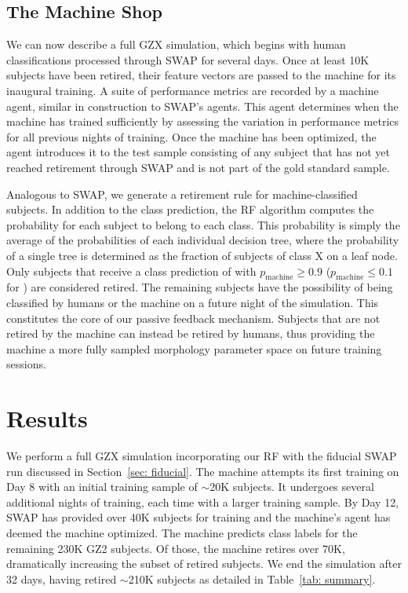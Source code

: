 \subsection{The Machine Shop}\label{sec: machine shop}
We can now describe a full GZX simulation, which begins with human classifications 
processed through SWAP for several days.   
Once at least 10K subjects have been retired, their feature vectors are passed to 
the machine for its inaugural training. 
A suite of performance metrics are recorded by a machine agent, similar
in construction to SWAP's agents. This agent determines 
when the machine has trained sufficiently by assessing the variation
in performance metrics for all previous nights of training. 
Once the machine has been optimized, the agent introduces it to the test sample
consisting of any subject that has not yet reached retirement through SWAP 
and is not part of the gold standard sample.  

Analogous to SWAP, we generate a retirement rule for machine-classified subjects. 
In addition to the class prediction, the RF algorithm computes the probability for
each subject to belong to each class.  This probability is simply the average of
 the probabilities of each individual decision tree, where the probability of a 
single tree is determined as the fraction of subjects of class X on a leaf node.  
Only subjects that receive a class prediction of \feat with 
$p_{\mathrm{machine}} \ge 0.9$ ($p_{\mathrm{machine}} \le 0.1$ for \notfeat)
are considered retired. 
The remaining subjects have the possibility of being classified by humans 
or the machine on a future night of the simulation. 
This constitutes the core of our passive feedback mechanism. Subjects that are
not retired by the machine can instead be retired by humans, thus providing 
the machine a more fully sampled morphology parameter space on future 
training sessions. 




\section{Results} \label{sec: results}
We perform a full GZX simulation incorporating our RF with the fiducial 
SWAP run discussed in Section~\ref{sec: fiducial}. 
The machine attempts its first training on Day 8 with an initial training
sample of $\sim$20K subjects. It undergoes several additional nights 
of training, each time with a larger training sample. 
By Day 12, SWAP has provided over 40K subjects for training and the machine's 
agent has deemed the machine optimized. 
The machine predicts class labels for the remaining 230K GZ2 subjects. 
Of those, the machine retires over 70K, dramatically increasing the 
subset of retired subjects. 
We end the simulation after 32 days, having retired $\sim$210K subjects
as detailed in Table~\ref{tab: summary}. 


